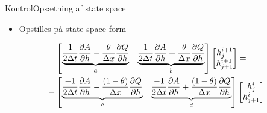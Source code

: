 \begin{frame}{Kontrol}{Opsætning af state space}
 \vfill\vfill\centering    
\begin{itemize}
	\item Opstilles på state space form   \vspace{5mm}
\end{itemize}
\begin{equation*}\label{eq:rearrange_continuity_eq}
\begin{aligned}
	&\begin{bmatrix}
		\underbrace{\frac{1}{2\Delta t}\frac{\partial A}{\partial h}-\frac{\theta}{\Delta x}\frac{\partial Q}{\partial h}}_{a} & \underbrace{\frac{1}{2\Delta t}\frac{\partial A}{\partial h}+\frac{\theta}{\Delta x}\frac{\partial Q}{\partial h}}_{b} 
	\end{bmatrix}
	\begin{bmatrix}
		h_{j}^{i+1} \\
		h_{j+1}^{i+1}
	\end{bmatrix}
	= \\ \vspace{5mm} -
	&\begin{bmatrix}
		\underbrace{\frac{-1}{2\Delta t}\frac{\partial A}{\partial h}-\frac{(1-\theta)}{\Delta x}\frac{\partial Q}{\partial h}}_{c} & \underbrace{\frac{-1}{2\Delta t}\frac{\partial A}{\partial h}+\frac{(1-\theta)}{\Delta x}\frac{\partial Q}{\partial h}}_{d} 
	\end{bmatrix}
	\begin{bmatrix}
		h_{j}^{i} \\
		h_{j+1}^{i}
	\end{bmatrix}
	\end{aligned}
\end{equation*}
\vfill\vfill
\end{frame}




